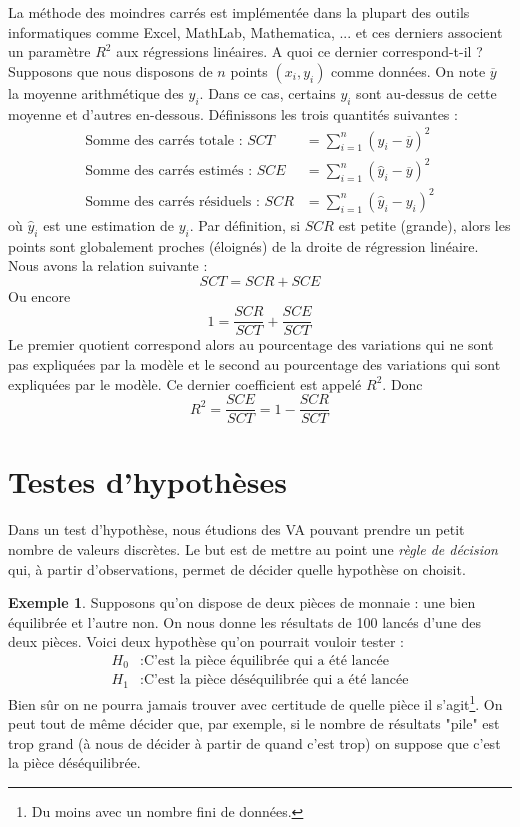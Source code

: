 \documentclass[a4paper,12pt]{report}
\theoremstyle{definition}
\renewcommand{\(}{\left(}
\renewcommand{\)}{\right)}
\renewcommand{\t}{\text}
\renewcommand{\d}{\textit}
\renewcommand{\bar}{\overline}
\newtheorem{exmp}[thm]{Exemple}
\begin{document}
            La méthode des moindres carrés est implémentée dans la plupart des outils informatiques comme Excel, MathLab, Mathematica, ... et ces derniers associent un paramètre $R^2$ aux régressions linéaires. A quoi ce dernier correspond-t-il ? Supposons que nous disposons de $n$ points $(x_i,y_i)$ comme données. On note $\bar{y}$ la moyenne arithmétique des $y_i$. Dans ce cas, certains $y_i$ sont au-dessus de cette moyenne et d'autres en-dessous. Définissons les trois quantités suivantes :
            \begin{align*}
                \t{Somme des carrés totale : } SCT &= \sum_{i=1}^n (y_i-\bar{y})^2 \\
                \t{Somme des carrés estimés : } SCE &= \sum_{i=1}^n (\hat{y}_i-\bar{y})^2 \\
                \t{Somme des carrés résiduels : } SCR &= \sum_{i=1}^n (\hat{y}_i-y_i)^2
            \end{align*}
            où $\hat{y}_i$ est une estimation de $y_i$.
            Par définition, si $SCR$ est petite (grande), alors les points sont globalement proches (éloignés) de la droite de régression linéaire. Nous avons la relation suivante :
            $$SCT = SCR + SCE$$
            Ou encore
            $$1 = \frac{SCR}{SCT} + \frac{SCE}{SCT}$$
            Le premier quotient correspond alors au pourcentage des variations qui ne sont pas expliquées par la modèle et le second au pourcentage des variations qui sont expliquées par le modèle. Ce dernier coefficient est appelé $R^2$. Donc
            $$R^2 = \frac{SCE}{SCT} = 1-\frac{SCR}{SCT}$$
        
    \section{Testes d'hypothèses}
    
        Dans un test d'hypothèse, nous étudions des VA pouvant prendre un petit nombre de valeurs discrètes. Le but est de mettre au point une \d{règle de décision} qui, à partir d'observations, permet de décider quelle hypothèse on choisit.
        
        \begin{exmp}
            Supposons qu'on dispose de deux pièces de monnaie : une bien équilibrée et l'autre non. On nous donne les résultats de 100 lancés d'une des deux pièces. Voici deux hypothèse qu'on pourrait vouloir tester :
            \begin{align*}
                H_0 &: \t{C'est la pièce équilibrée qui a été lancée} \\
                H_1 &: \t{C'est la pièce déséquilibrée qui a été lancée}
            \end{align*}
            Bien sûr on ne pourra jamais trouver avec certitude de quelle pièce il s'agit\footnote{Du moins avec un nombre fini de données.}. On peut tout de même décider que, par exemple, si le nombre de résultats "pile" est trop grand (à nous de décider à partir de quand c'est trop) on suppose que c'est la pièce déséquilibrée.
        \end{exmp}
    
\end{document}
